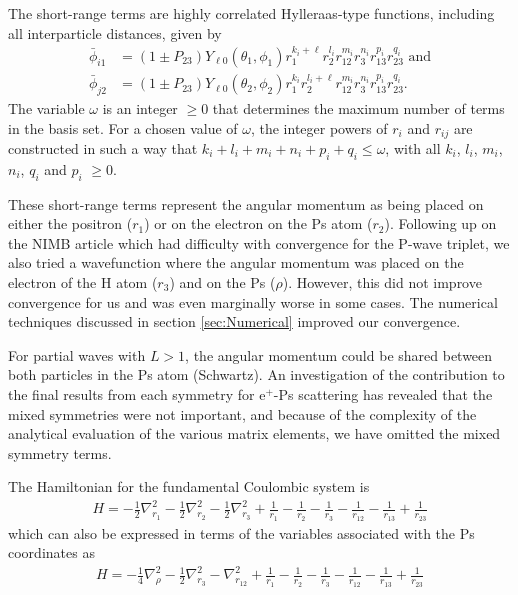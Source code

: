 \documentclass[preprint,showpacs,preprintnumbers,amsmath,amssymb]{revtex4}
\begin{document}
The short-range terms are highly correlated Hylleraas-type functions, including all interparticle distances, given by
\begin{subequations}
\label{eq:PhiDef}
\begin{align}
\bar{\phi}_{i1} &= \left(1 \pm P_{23}\right) Y_{\ell 0}(\theta_1,\phi_1) r_1^{k_i + \ell} r_2^{l_i} r_{12}^{m_i} r_3^{n_i} r_{13}^{p_i} r_{23}^{q_i} \text{ and} \label{eq:PartialWavePhi1i}\\
\bar{\phi}_{j2} &= \left(1 \pm P_{23}\right) Y_{\ell 0}(\theta_2,\phi_2) r_1^{k_i} r_2^{l_i + \ell} r_{12}^{m_i} r_3^{n_i} r_{13}^{p_i} r_{23}^{q_i} \label{eq:PartialWavePhi2j}.
\end{align}
\end{subequations}
The variable $\omega$ is an integer $\geq 0$ that determines the maximum number of terms in the basis set.  For a chosen value of $\omega$, the integer powers of $r_i$ and $r_{ij}$ are constructed in such a way that $k_i + l_i + m_i + n_i + p_i + q_i \leq \omega$, with all $k_i$, $l_i$, $m_i$, $n_i$, $q_i$ and $p_i$ $\geq 0$.

These short-range terms represent the angular momentum as being placed on either the positron ($r_1$) or on the electron on the Ps atom ($r_2$).
Following up on the NIMB article \cite{VanReeth2004} which had difficulty with convergence for the P-wave triplet, we also tried a wavefunction where the angular momentum was placed on the electron of the H atom ($r_3$) and on the Ps ($\rho$). However, this did not improve convergence for us and was even marginally worse in some cases. The numerical techniques discussed in section \ref{sec:Numerical} improved our convergence.

For partial waves with $L>1$, the angular momentum could be shared between both particles in the Ps atom \cite{??} (Schwartz). An investigation of the contribution to the final results from each symmetry for e$^+$-Ps scattering \cite{Watts1994} has revealed that the mixed symmetries were not important, and because of the complexity of the analytical evaluation of the various matrix elements, we have omitted the mixed symmetry terms.


The Hamiltonian for the fundamental Coulombic system is
\begin{align}
H = -\frac{1}{2} \nabla_{r_1}^2 - \frac{1}{2} \nabla_{r_2}^2 - \frac{1}{2} \nabla_{r_3}^2 + \frac {1}{r_1}-\frac {1}{r_2}-\frac {1}{r_3}-\frac {1}{r_{12}}-\frac {1}{r_{13}}+\frac {1}{r_{23}}
	\label{Hamiltonian1}
\end{align}
which can also be expressed in terms of the variables associated with the Ps coordinates as
\begin{align}
H = -\frac{1}{4} \nabla_{\rho}^2 - \frac{1}{2} \nabla_{r_3}^2 - \nabla_{r_{12}}^2 + \frac {1}{r_1}-\frac {1}{r_2}-\frac {1}{r_3}-\frac {1}{r_{12}}-\frac {1}{r_{13}}+\frac {1}{r_{23}}
	\label{Hamiltonian2}
\end{align}
\end{document}
